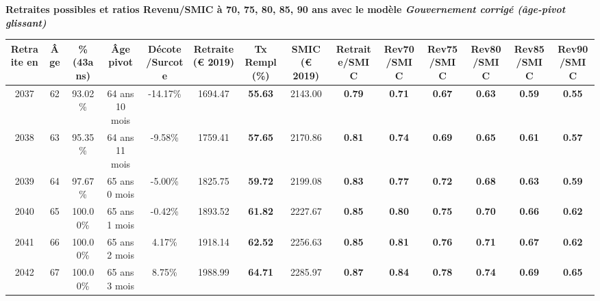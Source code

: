  \vspace{0.1cm} 
{\bf \noindent Retraites possibles et ratios Revenu/SMIC à 70, 75, 80, 85, 90 ans avec le modèle \emph{Gouvernement corrigé (âge-pivot glissant)}}  
 
\begin{adjustbox}{max width=\textwidth} 
\begin{tabular}[htb]{|c|c||c|c|c||c|c||c||c|c|c|c|c|c|} 
\hline 
 Retraite en &  Âge &  \%(43ans) &  Âge pivot &  Décote/Surcote &  Retraite (\euro{} 2019) &  Tx Rempl(\%) &  SMIC (\euro{} 2019) &  Retraite/SMIC &  Rev70/SMIC &  Rev75/SMIC &  Rev80/SMIC &  Rev85/SMIC &  Rev90/SMIC \\ 
\hline \hline 
 2037 &  62 &  93.02\% &  64 ans 10 mois &  -14.17\% &  1694.47 &  {\bf 55.63} &  2143.00 &  {\bf {\color{red} 0.79}} &  {\bf {\color{red} 0.71}} &  {\bf {\color{red} 0.67}} &  {\bf {\color{red} 0.63}} &  {\bf {\color{red} 0.59}} &  {\bf {\color{red} 0.55}} \\ 
\hline 
 2038 &  63 &  95.35\% &  64 ans 11 mois &  -9.58\% &  1759.41 &  {\bf 57.65} &  2170.86 &  {\bf {\color{red} 0.81}} &  {\bf {\color{red} 0.74}} &  {\bf {\color{red} 0.69}} &  {\bf {\color{red} 0.65}} &  {\bf {\color{red} 0.61}} &  {\bf {\color{red} 0.57}} \\ 
\hline 
 2039 &  64 &  97.67\% &  65 ans 0 mois &  -5.00\% &  1825.75 &  {\bf 59.72} &  2199.08 &  {\bf {\color{red} 0.83}} &  {\bf {\color{red} 0.77}} &  {\bf {\color{red} 0.72}} &  {\bf {\color{red} 0.68}} &  {\bf {\color{red} 0.63}} &  {\bf {\color{red} 0.59}} \\ 
\hline 
 2040 &  65 &  100.00\% &  65 ans 1 mois &  -0.42\% &  1893.52 &  {\bf 61.82} &  2227.67 &  {\bf {\color{red} 0.85}} &  {\bf {\color{red} 0.80}} &  {\bf {\color{red} 0.75}} &  {\bf {\color{red} 0.70}} &  {\bf {\color{red} 0.66}} &  {\bf {\color{red} 0.62}} \\ 
\hline 
 2041 &  66 &  100.00\% &  65 ans 2 mois &  4.17\% &  1918.14 &  {\bf 62.52} &  2256.63 &  {\bf {\color{red} 0.85}} &  {\bf {\color{red} 0.81}} &  {\bf {\color{red} 0.76}} &  {\bf {\color{red} 0.71}} &  {\bf {\color{red} 0.67}} &  {\bf {\color{red} 0.62}} \\ 
\hline 
 2042 &  67 &  100.00\% &  65 ans 3 mois &  8.75\% &  1988.99 &  {\bf 64.71} &  2285.97 &  {\bf {\color{red} 0.87}} &  {\bf {\color{red} 0.84}} &  {\bf {\color{red} 0.78}} &  {\bf {\color{red} 0.74}} &  {\bf {\color{red} 0.69}} &  {\bf {\color{red} 0.65}} \\ 
\hline 
\hline 
\end{tabular} 
\end{adjustbox} 
 
